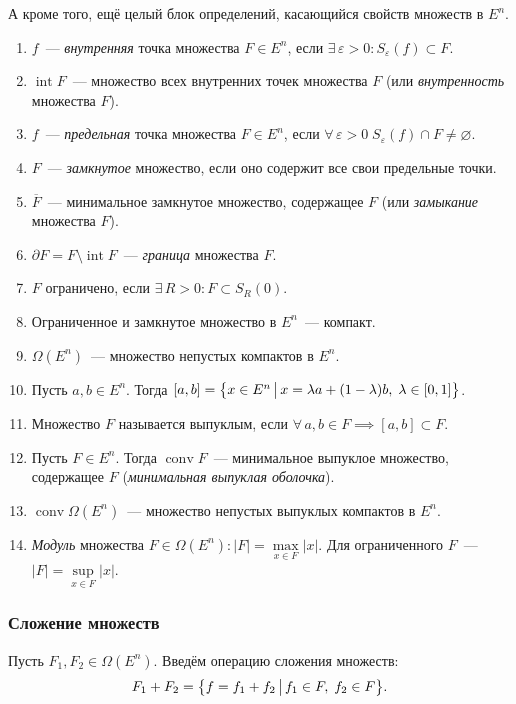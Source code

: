 А кроме того, ещё целый блок определений, касающийся свойств множеств в $E^n$.
\begin{enumerate}
    \item $f$~--- \textit{внутренняя} точка множества $F \in E^n$, если $\exists \, \varepsilon > 0\colon S_\varepsilon(f) \subset F$.
    \item $\operatorname{int} F$~--- множество всех внутренних точек множества $F$ (или \textit{внутренность} множества $F$).
    \item $f$~--- \textit{предельная} точка множества $F \in E^n$, если $\forall \, \varepsilon > 0 \; S_\varepsilon(f) \cap F \neq \varnothing$.
    \item $F$~--- \textit{замкнутое} множество, если оно содержит все свои предельные точки.
    \item $\overline{F}$~--- минимальное замкнутое множество, содержащее $F$ (или \textit{замыкание} множества $F$).
    \item $\partial F = F \setminus \operatorname{int} F$~--- \textit{граница} множества $F$.
    \item $F$ ограничено, если $\exists \, R > 0\colon F \subset S_R(0)$.
    \item Ограниченное и замкнутое множество в $E^n$~--- компакт.
    \item $\Omega(E^n)$~--- множество непустых компактов в $E^n$.
    \item Пусть $a, b \in E^n$. Тогда $[a, b] = \bigl\{ x \in E^n \, \bigl| \, x = \lambda a + (1 - \lambda)b, \; \lambda \in [0,1] \bigr\}$.
    \item Множество $F$ называется выпуклым, если $\forall \, a, b \in F \implies [a, b] \subset F$.
    \item Пусть $F \in E^n$. Тогда $\operatorname{conv} F$~--- минимальное выпуклое множество, содержащее $F$ (\textit{минимальная выпуклая оболочка}).
    \item $\operatorname{conv} \Omega(E^n)$~--- множество непустых выпуклых компактов в $E^n$.
    \item \textit{Модуль} множества $F \in \Omega(E^n)\colon |F| = \max\limits_{x \in F} |x|$.
    Для ограниченного $F$~--- $|F| = \sup\limits_{x \in F} |x|$.
\end{enumerate}

\subsubsection{Сложение множеств}
\begin{defn}
    Пусть $F_1, F_2 \in \Omega(E^n)$.
    Введём операцию сложения множеств:
    \begin{equation*}
        F_1 + F_2 = \bigl\{f = f_1 + f_2 \, \bigl| \, f_1 \in F, \; f_2 \in F\bigr\}.
    \end{equation*}
\end{defn}

